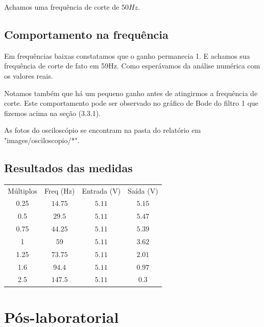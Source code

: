 \documentclass[12pt,twoside, a4paper, twocolumn]{article}
\begin{document}
Achamos uma frequência de corte de $50Hz$.




\pagebreak






\subsection{Comportamento na frequência}


Em frequências baixas constatamos que o ganho permanecia 1. E achamos sua frequência de corte de fato em 59Hz. Como esperávamos da análise numérica com os valores reais.


Notamos também que há um pequeno ganho antes de atingirmos a frequência de corte. Este comportamento pode ser observado no gráfico de Bode do filtro 1 que fizemos acima na seção (3.3.1).


As fotos do osciloscópio se encontram na pasta do relatório em "images/osciloscopio/*".




\subsection{Resultados das medidas}
\begin{center}
    \begin{tabular}{ |c|c|c|c| }
        \hline
        Múltiplos & Freq (Hz) & Entrada (V) & Saída (V) \\
        0.25      & $14.75$   & $5.11$      & $5.15$    \\
        0.5       & $29.5$    & $5.11$      & $5.47$    \\
        0.75      & $44.25$   & $5.11$      & $5.39$    \\
        1         & $59$      & $5.11$      & $3.62$    \\
        1.25      & $73.75$   & $5.11$      & $2.01$    \\
        1.6       & $94.4$    & $5.11$      & $0.97$    \\
        2.5       & $147.5$   & $5.11$      & $0.3$     \\
        \hline
    \end{tabular}
\end{center}




\newpage




\section{Pós-laboratorial}
\end{document}
